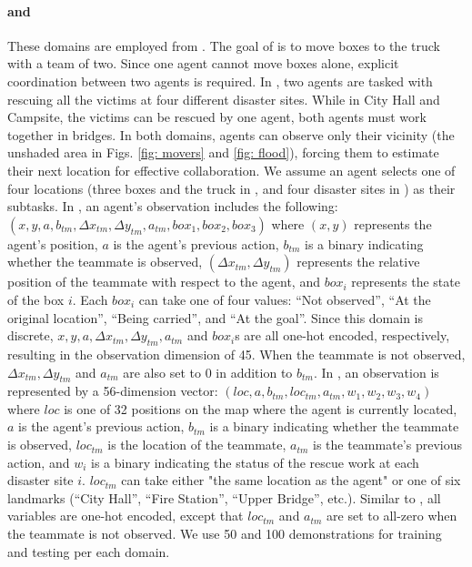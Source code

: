 \paragraph{\movers and \rescue} These domains are employed from \cite{seo2023automated}. The goal of \movers is to move boxes to the truck with a team of two.  Since one agent cannot move boxes alone, explicit coordination between two agents is required. In \rescue, two agents are tasked with rescuing all the victims at four different disaster sites. While in City Hall and Campsite, the victims can be rescued by one agent, both agents must work together in bridges. In both domains, agents can observe only their vicinity (the unshaded area in Figs. \ref{fig: movers} and \ref{fig: flood}), forcing them to estimate their next location for effective collaboration. We assume an agent selects one of four locations (three boxes and the truck in \movers, and four disaster sites in \rescue) as their subtasks. In \movers, an agent's observation includes the following:  $(x, y, a, b_{tm},\Delta x_{tm},\Delta y_{tm}, a_{tm}, box_1, box_2, box_3)$ where $(x, y)$ represents the agent's position, $a$ is the agent's previous action, $b_{tm}$ is a binary indicating whether the teammate is observed, $(\Delta x_{tm}, \Delta y_{tm})$ represents the relative position of the teammate with respect to the agent, and $box_i$ represents the state of the box $i$. Each $box_i$ can take one of four values: ``Not observed'', ``At the original location'', ``Being carried'', and ``At the goal''. Since this domain is discrete, $x, y, a,  \Delta x_{tm}, \Delta y_{tm}, a_{tm}$ and $box_i$s are all one-hot encoded, respectively, resulting in the observation dimension of 45. When the teammate is not observed, $\Delta x_{tm}, \Delta y_{tm}$ and $a_{tm}$ are also set to 0 in addition to $b_{tm}$. In \rescue, an observation is represented by a 56-dimension vector: $(loc, a, b_{tm}, loc_{tm}, a_{tm}, w_1, w_2, w_3, w_4)$ where $loc$ is one of 32 positions on the map where the agent is currently located, $a$ is the agent's previous action, $b_{tm}$ is a binary indicating whether the teammate is observed, $loc_{tm}$ is the location of the teammate, $a_{tm}$ is the teammate's previous action, and $w_i$ is a binary indicating the status of the rescue work at each disaster site $i$. $loc_{tm}$ can take either "the same location as the agent" or one of six landmarks (``City Hall'', ``Fire Station'', ``Upper Bridge'', etc.). Similar to \movers, all variables are one-hot encoded, except that $loc_{tm}$ and $a_{tm}$ are set to all-zero when the teammate is not observed.
We use 50 and 100 demonstrations for training and testing per each domain.


